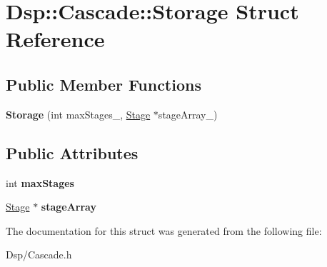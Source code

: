 \hypertarget{structDsp_1_1Cascade_1_1Storage}{\section{Dsp\-:\-:Cascade\-:\-:Storage Struct Reference}
\label{structDsp_1_1Cascade_1_1Storage}
}
\subsection*{Public Member Functions}
\begin{DoxyCompactItemize}
\item 
\hypertarget{structDsp_1_1Cascade_1_1Storage_aabcdca3fe00bedb395e80610e45c3cec}{{\bfseries Storage} (int max\-Stages\-\_\-, \hyperlink{structDsp_1_1Cascade_1_1Stage}{Stage} $\ast$stage\-Array\-\_\-)}\label{structDsp_1_1Cascade_1_1Storage_aabcdca3fe00bedb395e80610e45c3cec}

\end{DoxyCompactItemize}
\subsection*{Public Attributes}
\begin{DoxyCompactItemize}
\item 
\hypertarget{structDsp_1_1Cascade_1_1Storage_a9fcb02af060f9aa9c69d7c93c56e5962}{int {\bfseries max\-Stages}}\label{structDsp_1_1Cascade_1_1Storage_a9fcb02af060f9aa9c69d7c93c56e5962}

\item 
\hypertarget{structDsp_1_1Cascade_1_1Storage_aa1bd80e87aa053b614edd503abe875ff}{\hyperlink{structDsp_1_1Cascade_1_1Stage}{Stage} $\ast$ {\bfseries stage\-Array}}\label{structDsp_1_1Cascade_1_1Storage_aa1bd80e87aa053b614edd503abe875ff}

\end{DoxyCompactItemize}


The documentation for this struct was generated from the following file\-:\begin{DoxyCompactItemize}
\item 
Dsp/Cascade.\-h\end{DoxyCompactItemize}
